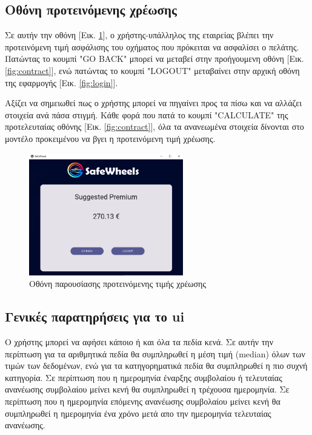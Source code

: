 \documentclass{llncs}
\begin{document}
\newpage
\subsection {Οθόνη προτεινόμενης χρέωσης}
Σε αυτήν την οθόνη [Εικ. \ref{fig:premium}], ο χρήστης-υπάλληλος της εταιρείας βλέπει την προτεινόμενη τιμή ασφάλισης του οχήματος που πρόκειται να ασφαλίσει ο πελάτης.
Πατώντας το κουμπί "GO BACK" μπορεί να μεταβεί στην προήγουμενη οθόνη [Εικ. \ref{fig:contract}], ενώ πατώντας το κουμπί "LOGOUT" μεταβαίνει στην αρχική οθόνη της εφαρμογής [Εικ. \ref{fig:login}].

Αξίζει να σημειωθεί πως ο χρήστης μπορεί να πηγαίνει προς τα πίσω και να αλλάζει στοιχεία ανά πάσα στιγμή. Κάθε φορά που πατά το κουμπί "CALCULATE" της προτελευταίας οθόνης [Εικ. \ref{fig:contract}], 
όλα τα ανανεωμένα στοιχεία δίνονται στο μοντέλο προκειμένου να βγει η προτεινόμενη τιμή χρέωσης.

\begin{figure}
    \begin{center}
        \includegraphics[width=0.6\textwidth]{images/suggested_premium.png}
    \end{center}
    \caption{Οθόνη παρουσίασης προτεινόμενης τιμής χρέωσης}  
    \label{fig:premium}  
\end{figure}

\subsection{Γενικές παρατηρήσεις για το ui}
Ο χρήστης μπορεί να αφήσει κάποιο ή και όλα τα πεδία κενά. Σε αυτήν την περίπτωση 
για τα αριθμητικά πεδία θα συμπληρωθεί η μέση τιμή (median) όλων των τιμών των δεδομένων, 
ενώ για τα κατηγορηματικά πεδία θα συμπληρωθεί η πιο συχνή κατηγορία. Σε περίπτωση που 
η ημερομηνία έναρξης συμβολαίου ή τελευταίας ανανέωσης συμβολαίου μείνει κενή 
θα συμπληρωθεί η τρέχουσα ημερομηνία. 
Σε περίπτωση που η ημερομηνία επόμενης ανανέωσης συμβολαίου μείνει 
κενή θα συμπληρωθεί η ημερομηνία ένα χρόνο μετά απο την ημερομηνία τελευταίας ανανέωσης.
\end{document}
